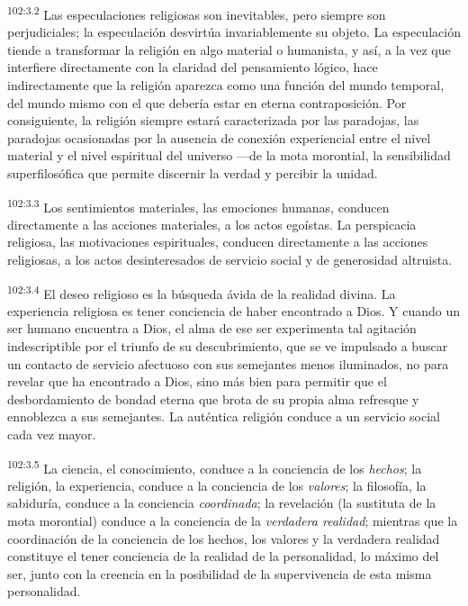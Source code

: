 \documentclass[twoside, 11pt]{book}
\begin{document}
\par
\textsuperscript{102:3.2} Las especulaciones religiosas son inevitables, pero siempre son perjudiciales; la especulación desvirtúa invariablemente su objeto. La especulación tiende a transformar la religión en algo material o humanista, y así, a la vez que interfiere directamente con la claridad del pensamiento lógico, hace indirectamente que la religión aparezca como una función del mundo temporal, del mundo mismo con el que debería estar en eterna contraposición. Por consiguiente, la religión siempre estará caracterizada por las paradojas, las paradojas ocasionadas por la ausencia de conexión experiencial entre el nivel material y el nivel espiritual del universo ---de la mota morontial, la sensibilidad superfilosófica que permite discernir la verdad y percibir la unidad.

\par
\textsuperscript{102:3.3} Los sentimientos materiales, las emociones humanas, conducen directamente a las acciones materiales, a los actos egoístas. La perspicacia religiosa, las motivaciones espirituales, conducen directamente a las acciones religiosas, a los actos desinteresados de servicio social y de generosidad altruista.

\par
\textsuperscript{102:3.4} El deseo religioso es la búsqueda ávida de la realidad divina. La experiencia religiosa es tener conciencia de haber encontrado a Dios. Y cuando un ser humano encuentra a Dios, el alma de ese ser experimenta tal agitación indescriptible por el triunfo de su descubrimiento, que se ve impulsado a buscar un contacto de servicio afectuoso con sus semejantes menos iluminados, no para revelar que ha encontrado a Dios, sino más bien para permitir que el desbordamiento de bondad eterna que brota de su propia alma refresque y ennoblezca a sus semejantes. La auténtica religión conduce a un servicio social cada vez mayor.

\par
\textsuperscript{102:3.5} La ciencia, el conocimiento, conduce a la conciencia de los \textit{hechos}; la religión, la experiencia, conduce a la conciencia de los \textit{valores}; la filosofía, la sabiduría, conduce a la conciencia \textit{coordinada}; la revelación (la sustituta de la mota morontial) conduce a la conciencia de la \textit{verdadera realidad}; mientras que la coordinación de la conciencia de los hechos, los valores y la verdadera realidad constituye el tener conciencia de la realidad de la personalidad, lo máximo del ser, junto con la creencia en la posibilidad de la supervivencia de esta misma personalidad.
\end{document}
